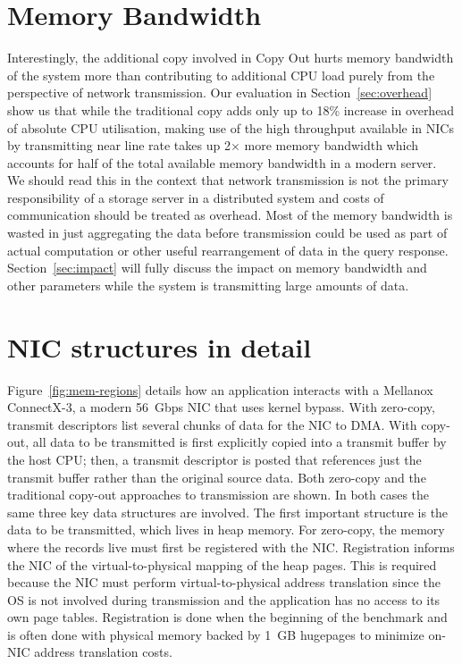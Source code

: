 \section{Memory Bandwidth}
Interestingly, the additional copy involved in Copy Out hurts memory bandwidth of the system more than contributing 
to additional CPU load purely from the perspective of network transmission. Our evaluation in Section~\ref{sec:overhead} show us that while the traditional
copy adds only up to 18\% increase in overhead of absolute CPU utilisation, making use of the 
high throughput available in NICs by transmitting near line rate takes up 2$\times$ more memory bandwidth 
which accounts for half of the total available memory bandwidth in a modern server. We should read this in the context that 
network transmission is not the primary responsibility of a storage server in a distributed system and costs of communication should be treated as overhead.
 Most of the memory bandwidth is wasted in just aggregating the data before transmission could be used as part of actual computation or other useful rearrangement of data in 
the query response. Section~\ref{sec:impact} will fully discuss the impact on memory bandwidth and other parameters while the system 
is transmitting large amounts of data.


\section{NIC structures in detail}
Figure~\ref{fig:mem-regions} details how an application interacts with a Mellanox
ConnectX-3\textregistered , a modern 56~Gbps NIC that uses kernel bypass. 
With zero-copy, transmit descriptors list several chunks of data for
the NIC to DMA. With copy-out, all data to be transmitted is first explicitly
copied into a transmit buffer by the host CPU; then, a transmit descriptor is
posted that references just the transmit buffer rather than the original
source data. Both zero-copy and the traditional copy-out approaches to transmission are shown.
In both cases the same three key data structures are involved. The first important structure is the
data to be transmitted, which lives in heap memory.  For zero-copy, the memory
where the records live must first be registered with the NIC. Registration
informs the NIC of the virtual-to-physical mapping of the heap pages. This is
required because the NIC must perform virtual-to-physical address translation
since the OS is not involved during transmission and the application has no
access to its own page tables.  Registration is done when the beginning of the benchmark and is often
done with physical memory backed by 1~GB hugepages to minimize on-NIC address
translation costs.



